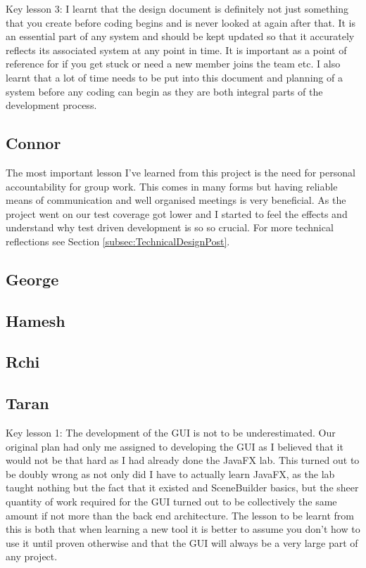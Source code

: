 Key lesson 3:
I learnt that the design document is definitely not just something that you create before coding begins and is never looked at again after that. It is an essential part of any system and should be kept updated so that it accurately reflects its associated system  at any point in time. It is important as a point of reference for if you get stuck or need a new member joins the team etc. I also learnt that a lot of time needs to be put into this document and planning of a system before any coding can begin as they are both integral parts of the development process. 


\subsection{Connor}
The most important lesson I've learned from this project is the need for personal accountability for group work. This comes in many forms but having reliable means of communication and well organised meetings is very beneficial. As the project went on our test coverage got lower and I started to feel the effects and understand why test driven development is so so crucial. For more technical reflections see Section \ref{subsec:TechnicalDesignPost}.

\subsection{George}

\subsection{Hamesh}

\subsection{Rchi}

\subsection{Taran}
Key lesson 1:
The development of the GUI is not to be underestimated. Our original plan had only me assigned to developing the GUI as I believed that it would not be that hard as I had already done the JavaFX lab. This turned out to be doubly wrong as not only did I have to actually learn JavaFX, as the lab taught nothing but the fact that it existed and SceneBuilder basics, but the sheer quantity of work required for the GUI turned out to be collectively the same amount if not more than the back end architecture.
The lesson to be learnt from this is both that when learning a new tool it is better to assume you don't how to use it until proven otherwise and that the GUI will always be a very large part of any project.

